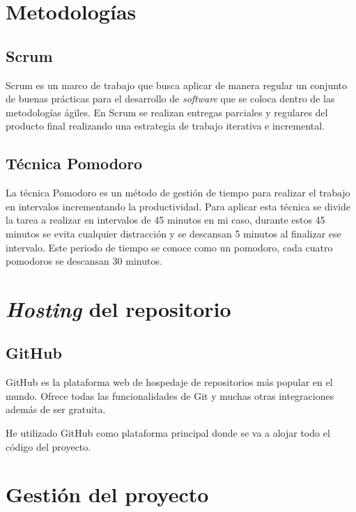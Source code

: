 
\section{Metodologías}\label{metodologias}

\subsection{Scrum}\label{scrum}

Scrum es un marco de trabajo que busca aplicar de manera regular un conjunto de buenas prácticas para el desarrollo de \emph{software}  que se coloca dentro de las metodologías ágiles. En Scrum se realizan entregas parciales y regulares del producto final realizando una estrategia de trabajo iterativa e incremental.

\subsection{Técnica Pomodoro}\label{pomodoro}

La técnica Pomodoro es un método de gestión de tiempo para realizar el trabajo en intervalos incrementando la productividad.
Para aplicar esta técnica se divide la tarea a realizar en intervalos de 45 minutos en mi caso, durante estos 45 minutos se evita cualquier distracción y se descansan 5 minutos al finalizar ese intervalo.
Este periodo de tiempo se conoce como un pomodoro, cada cuatro pomodoros se descansan 30 minutos.

\section{\emph{Hosting} del repositorio}\label{hosting-del-repositorio}

\subsection{GitHub}\label{GitHub}
GitHub es la plataforma web de hospedaje de repositorios más popular en el mundo.
Ofrece todas las funcionalidades de Git y muchas otras integraciones además de ser gratuita.

He utilizado GitHub como plataforma principal donde se va a alojar todo el código del proyecto.

\section{Gestión del proyecto}\label{gestion-del-proyecto}

